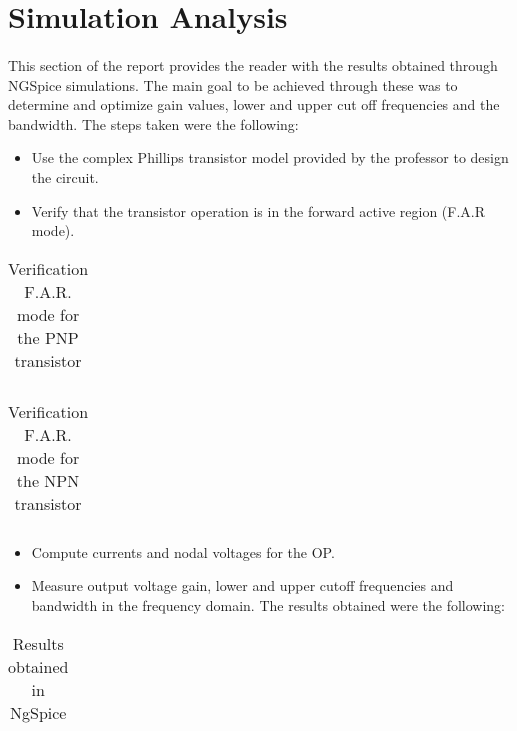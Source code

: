 \section{Simulation Analysis}
\label{sec:simulation}
\paragraph{}
\par This section of the report provides the reader with the results obtained through NGSpice simulations. The main goal to be achieved through these was to determine and optimize gain values, lower and upper cut off frequencies and the bandwidth. The steps taken were the following:
\begin{itemize}
	\item Use the complex Phillips transistor model provided by the professor to design the circuit.
	\item Verify that the transistor operation is in the forward active region (F.A.R mode).
\end{itemize}

\begin{table}[H]
  \centering
  \begin{tabular}{|c|c|}
    \hline    
    
  \end{tabular}
  \caption{Verification F.A.R. mode for the PNP transistor}
  \label{sim1}
\end{table}


\begin{table}[H]
  \centering
  \begin{tabular}{|c|c|}
    \hline    
    
  \end{tabular}
  \caption{Verification F.A.R. mode for the NPN transistor}
  \label{sim1}
\end{table}

\begin{itemize}
	\item Compute currents and nodal voltages for the OP.
	\item Measure output voltage gain, lower and upper cutoff frequencies and bandwidth in the frequency domain. The results obtained were the following:
\end{itemize}

\begin{table}[H]
  \centering
  \begin{tabular}{|c|c|}
    \hline    
    
  \end{tabular}
  \caption{Results obtained in NgSpice}
  \label{sim1}
\end{table}


